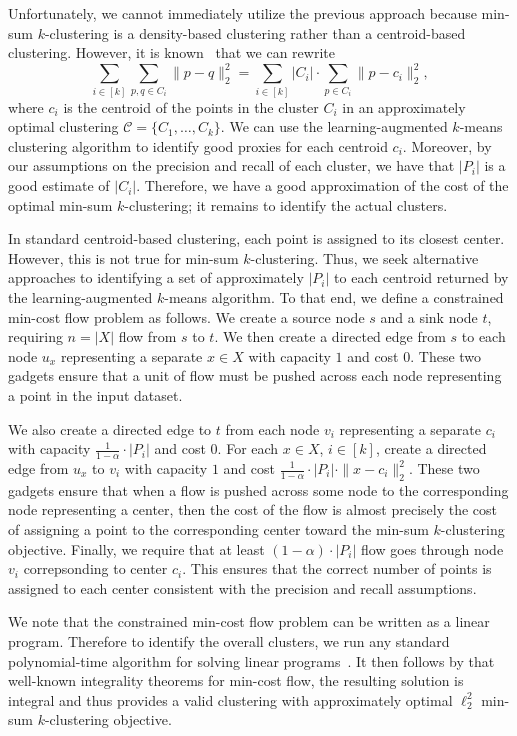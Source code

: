 \documentclass[10pt,a4paper]{amsart}
\begin{document}
Unfortunately, we cannot immediately utilize the previous approach because min-sum $k$-clustering is a density-based clustering rather than a centroid-based clustering. 
However, it is known~\cite{InabaKI94} that we can rewrite
\[\sum_{i\in[k]}\sum_{p,q\in C_i}\|p-q\|_2^2=\sum_{i\in[k]}|C_i|\cdot\sum_{p\in C_i}\|p-c_i\|_2^2,\]
where $c_i$ is the centroid of the points in the cluster $C_i$ in an approximately optimal clustering $\mathcal{C}=\{C_1,\ldots,C_k\}$. 
We can use the learning-augmented $k$-means clustering algorithm to identify good proxies for each centroid $c_i$. 
Moreover, by our assumptions on the precision and recall of each cluster, we have that $|P_i|$ is a good estimate of $|C_i|$. 
Therefore, we have a good approximation of the cost of the optimal min-sum $k$-clustering; it remains to identify the actual clusters. 

In standard centroid-based clustering, each point is assigned to its closest center. 
However, this is not true for min-sum $k$-clustering. 
Thus, we seek alternative approaches to identifying a set of approximately $|P_i|$ to each centroid returned by the learning-augmented $k$-means algorithm. 
To that end, we define a constrained min-cost flow problem as follows. 
We create a source node $s$ and a sink node $t$, requiring $n=|X|$ flow from $s$ to $t$. 
We then create a directed edge from $s$ to each node $u_x$ representing a separate $x\in X$ with capacity $1$ and cost $0$. 
These two gadgets ensure that a unit of flow must be pushed across each node representing a point in the input dataset. 

We also create a directed edge to $t$ from each node $v_i$ representing a separate $c_i$ with capacity $\frac{1}{1-\alpha}\cdot|P_i|$ and cost $0$. 
For each $x\in X$, $i\in[k]$, create a directed edge from $u_x$ to $v_i$ with capacity $1$ and cost $\frac{1}{1-\alpha}\cdot|P_i|\cdot\|x-c_i\|_2^2$. 
These two gadgets ensure that when a flow is pushed across some node to the corresponding node representing a center, then the cost of the flow is almost precisely the cost of assigning a point to the corresponding center toward the min-sum $k$-clustering objective. 
Finally, we require that at least $(1-\alpha)\cdot|P_i|$ flow goes through node $v_i$ correpsonding to center $c_i$. 
This ensures that the correct number of points is assigned to each center consistent with the precision and recall assumptions. 

We note that the constrained min-cost flow problem can be written as a linear program. 
Therefore to identify the overall clusters, we run any standard polynomial-time algorithm for solving linear programs~\cite{Karmarkar84,Vaidya89a,Vaidya90,LeeS15,LeeSZ19,CohenLS21,JiangSWZ21}. 
It then follows by that well-known integrality theorems for min-cost flow, the resulting solution is integral and thus provides a valid clustering with approximately optimal $\ell_2^2$ min-sum $k$-clustering objective. 
\end{document}
